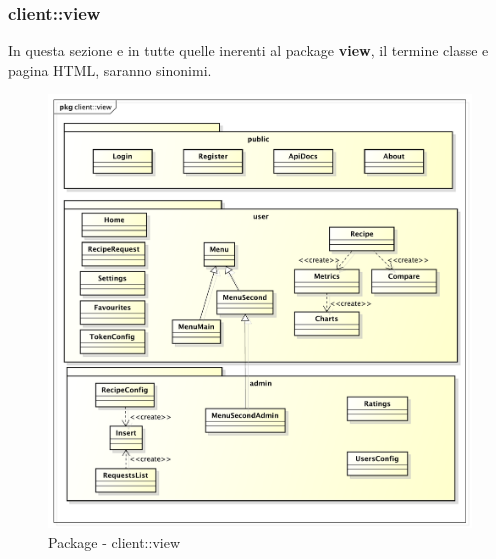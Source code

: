 %


\subsubsection{client::view} %
\label{ssub:bdsm_app_client_view}
In questa sezione e in tutte quelle inerenti al package \textbf{view}, il termine classe e pagina HTML, saranno sinonimi.
\begin{figure}[htbp]
	\centering
	\centerline{\includegraphics[scale=0.5]{./images/client/client_view.pdf}}
	\caption{Package - client::view}
\end{figure}

